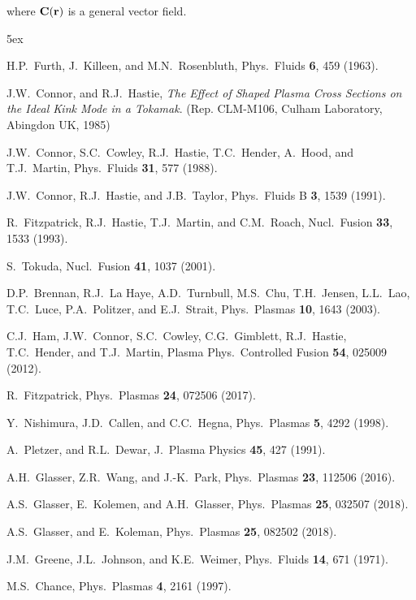 \documentclass[12pt,prb,aps]{revtex4-1}
\begin{document}
where ${\bf C}({\bf r})$ is a general vector field.

\begin{thebibliography}{99}\baselineskip 5ex

 H.P.~Furth,  J.~Killeen, and M.N.~Rosenbluth,  Phys.\ Fluids {\bf 6}, 459 (1963).

 J.W.~Connor, and R.J.~Hastie, {\em The Effect of Shaped Plasma Cross Sections on the Ideal Kink Mode in a Tokamak}. (Rep. CLM-M106, Culham Laboratory, Abingdon UK, 1985)

 J.W.~Connor,  S.C.~Cowley, R.J.~Hastie,  T.C.~Hender,  A.~Hood, and T.J.~Martin,  Phys.\ Fluids {\bf 31}, 577 (1988).

 J.W.~Connor, R.J.~Hastie, and J.B.~Taylor, Phys.\ Fluids B {\bf 3}, 1539 (1991).

 R.~Fitzpatrick, R.J.~Hastie, T.J.~Martin, and C.M.~Roach, Nucl.\ Fusion {\bf 33}, 1533 (1993).

 S.~Tokuda, Nucl.\ Fusion {\bf 41}, 1037 (2001).

 D.P.~Brennan, R.J.~La Haye, A.D.~Turnbull, M.S.~Chu, T.H.~Jensen, L.L.~Lao, T.C.~Luce, P.A.~Politzer, and E.J.~Strait, Phys.\ Plasmas {\bf 10}, 1643 (2003).

 C.J.~Ham, J.W.~Connor, S.C.~Cowley, C.G.~Gimblett, R.J.~Hastie, T.C.~Hender, and T.J.~Martin, Plasma Phys.\ Controlled Fusion {\bf 54}, 025009 (2012). 

 R.~Fitzpatrick, Phys.\ Plasmas {\bf 24}, 072506 (2017). 

 Y.~Nishimura, J.D.~Callen, and C.C.~Hegna, Phys.\ Plasmas {\bf 5}, 4292 (1998).

 A.~Pletzer, and R.L.~Dewar, J.\ Plasma Physics {\bf 45}, 427 (1991).

 A.H.~Glasser, Z.R.~Wang, and J.-K.~Park, Phys.\ Plasmas {\bf 23}, 112506 (2016).

 A.S.~Glasser, E.~Kolemen, and A.H.~Glasser, Phys.\ Plasmas {\bf 25}, 032507 (2018).

 A.S.~Glasser, and E.~Koleman, Phys.\ Plasmas {\bf 25}, 082502 (2018). 

 J.M.~Greene, J.L.~Johnson, and K.E.~Weimer,  Phys.\  Fluids  {\bf 14}, 671 (1971).

 M.S.~Chance, Phys.\ Plasmas {\bf 4}, 2161 (1997).


\end{thebibliography}
\end{document}
